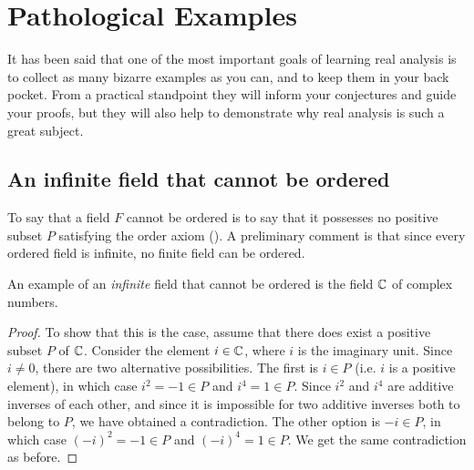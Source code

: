 \chapter{Pathological Examples}
It has been said that one of the most important goals of learning
real analysis is to collect as many bizarre examples as you can, and
to keep them in your back pocket. From a practical standpoint they
will inform your conjectures and guide your proofs, but they will
also help to demonstrate why real analysis is such a great subject.

\section{An infinite field that cannot be ordered}
To say that a field $F$ cannot be ordered is to say that it possesses
no positive subset $P$ satisfying the order axiom
(). A preliminary comment is that since every
ordered field is infinite, no finite field can be ordered.

An example of an \textit{infinite} field that cannot be ordered is
the field $\mathbb C$ of complex numbers.

\begin{proof}
  To show that this is the case, assume that there does exist a
  positive subset $P$ of $\mathbb C$. Consider the element $i \in \mathbb C$,
  where $i$ is the imaginary unit. Since $i \neq 0$, there are two
  alternative possibilities. The first is $i \in P$ (i.e. $i$ is a
  positive element), in which case $i^2 = -1 \in P$ and $i^4 = 1 \in
  P$. Since $i^2$ and $i^4$ are additive inverses of each other, and
  since it is impossible for two additive inverses both to belong to
  $P$, we have obtained a contradiction. The other option is $-i \in
  P$, in which case $(-i)^2 = -1 \in P$ and $(-i)^4 = 1 \in P$. We
  get the same contradiction as before.
\end{proof}
